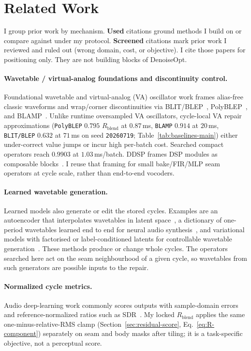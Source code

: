 \section{Related Work}
\label{sec:related_work}

I group prior work by mechanism.
\textbf{Used} citations ground methods I build on or compare against under my protocol.
\textbf{Screened} citations mark prior work I reviewed and ruled out (wrong domain, cost, or objective).
I cite those papers for positioning only.
They are not building blocks of DenoiseOpt.

\paragraph{Wavetable / virtual-analog foundations and discontinuity control.}
Foundational wavetable and virtual-analog (VA) oscillator work frames alias-free classic waveforms and wrap/corner discontinuities via BLIT/BLEP~\cite{stilson1996,valimaki2007polyblep}, PolyBLEP~\cite{valimaki2007polyblep}, and BLAMP~\cite{esqueda2016blamp}.
Unlike runtime oversampled VA oscillators, cycle-local VA repair approximations (\texttt{PolyBLEP} $0.795$ $R_{\mathrm{blend}}$ at $0.87$\,ms, \texttt{BLAMP} $0.914$ at $20$\,ms, \texttt{BLIT/BLEP} $0.632$ at $71$\,ms on seed \texttt{20260719}; Table~\ref{tab:baselines-main}) either under-correct value jumps or incur high per-batch cost. Searched compact operators reach $0.9903$ at $1.03$\,ms/batch.
DDSP frames DSP modules as composable blocks~\cite{engel2020}.
I reuse that framing for small bake/FIR/MLP seam operators at cycle scale, rather than end-to-end vocoders.

\paragraph{Learned wavetable generation.}
Learned models also generate or edit the stored cycles. Examples are an autoencoder that interpolates wavetables in latent space~\cite{hantrakul2018neuralwt}, a dictionary of one-period wavetables learned end to end for neural audio synthesis~\cite{shan2021dwts}, and variational models with factorised or label-conditioned latents for controllable wavetable generation~\cite{lee2024wavespace,yutani2024cvae}.
These methods produce or change whole cycles.
The operators searched here act on the seam neighbourhood of a given cycle, so wavetables from such generators are possible inputs to the repair.

\paragraph{Normalized cycle metrics.}
Audio deep-learning work commonly scores outputs with sample-domain errors and reference-normalized ratios such as SDR~\cite{purwins2019,stoller2018}.
My locked $R_{\mathrm{blend}}$ applies the same one-minus-relative-RMS clamp (Section~\ref{sec:residual-score}, Eq.~\eqref{eq:R-component}) separately on seam and body masks after tiling; it is a task-specific objective, not a perceptual score.

